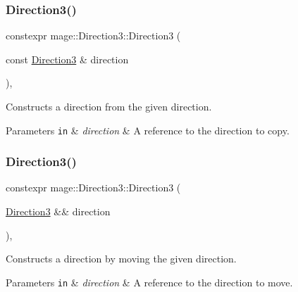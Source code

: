 \subsubsection{\texorpdfstring{Direction3()}{Direction3()}\hspace{0.1cm}{\footnotesize\ttfamily [3/6]}}
{\footnotesize\ttfamily constexpr mage\+::\+Direction3\+::\+Direction3 (\begin{DoxyParamCaption}\item[{const \hyperlink{structmage_1_1_direction3}{Direction3} \&}]{direction }\end{DoxyParamCaption})\hspace{0.3cm}{\ttfamily [default]}, {\ttfamily [noexcept]}}

Constructs a direction from the given direction.


\begin{DoxyParams}[1]{Parameters}
\mbox{\tt in}  & {\em direction} & A reference to the direction to copy. \\
\hline
\end{DoxyParams}
\hypertarget{structmage_1_1_direction3_aff1506b32f2b6dd49c2747eca90c76ce}{}\label{structmage_1_1_direction3_aff1506b32f2b6dd49c2747eca90c76ce} 
\subsubsection{\texorpdfstring{Direction3()}{Direction3()}\hspace{0.1cm}{\footnotesize\ttfamily [4/6]}}
{\footnotesize\ttfamily constexpr mage\+::\+Direction3\+::\+Direction3 (\begin{DoxyParamCaption}\item[{\hyperlink{structmage_1_1_direction3}{Direction3} \&\&}]{direction }\end{DoxyParamCaption})\hspace{0.3cm}{\ttfamily [default]}, {\ttfamily [noexcept]}}

Constructs a direction by moving the given direction.


\begin{DoxyParams}[1]{Parameters}
\mbox{\tt in}  & {\em direction} & A reference to the direction to move. \\
\hline
\end{DoxyParams}
\hypertarget{structmage_1_1_direction3_a180b7a9f58b37403d0be5b70519eafec}{}\label{structmage_1_1_direction3_a180b7a9f58b37403d0be5b70519eafec} 

